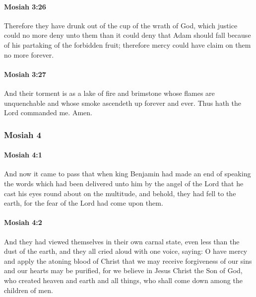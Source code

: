 		\paragraph{Mosiah 3:26} %
			\label{MOSIAH-3-26}

			Therefore they have drunk out of the cup of the wrath of God,
			which justice could no more deny unto them than it could deny
			that Adam should fall because of his partaking of the forbidden fruit;
			therefore mercy could have claim on them no more forever.

		\paragraph{Mosiah 3:27} %
			\label{MOSIAH-3-27}

			And their torment is as a lake of fire and brimstone
			whose flames are unquenchable
			and whose smoke ascendeth up forever and ever.
			Thus hath the Lord commanded me.
			Amen.
			
	\subsubsection{Mosiah 4} %
		\label{MOSIAH-4}
		
		\paragraph{Mosiah 4:1} %
			\label{MOSIAH-4-1}

			And now it came to pass that
			when king Benjamin had made an end of speaking the words
			which had been delivered unto him by the angel of the Lord
			that he cast his eyes round about on the multitude,
			and behold, they had fell to the earth,
			for the fear of the Lord had come upon them.

		\paragraph{Mosiah 4:2} %
			\label{MOSIAH-4-2}

			And they had viewed themselves in their own carnal state,
			even less than the dust of the earth,
			and they all cried aloud with one voice, saying:
			O have mercy and apply the atoning blood of Christ
			that we may receive forgiveness of our sins
			and our hearts may be purified,
			for we believe in Jesus Christ the Son of God,
			who created heaven and earth and all things,
			who shall come down among the children of men.

